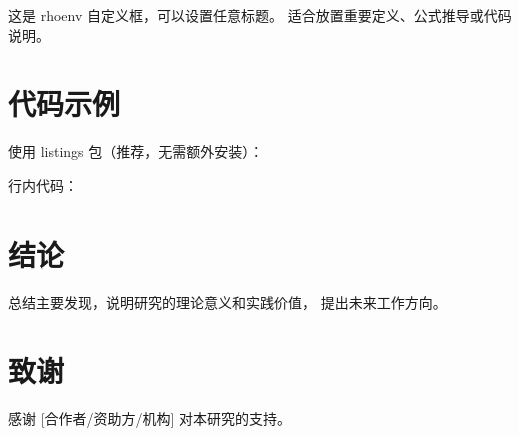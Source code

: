 \documentclass[9pt,a4paper,twocolumn,twoside]{rho-class/rho}
\begin{document}
    \begin{rhoenv}[frametitle=自定义标题框]
        这是 rhoenv 自定义框，可以设置任意标题。
        适合放置重要定义、公式推导或代码说明。
    \end{rhoenv}


\section{代码示例}

    使用 listings 包（推荐，无需额外安装）：

    \begin{code}
        
        \label{lst:code1}
        \caption{Python 示例代码。}
    \end{code}

    行内代码：


\section{结论}

    总结主要发现，说明研究的理论意义和实践价值，
    提出未来工作方向。


\section*{致谢}

    感谢 [合作者/资助方/机构] 对本研究的支持。


\printbibliography

\end{document}
